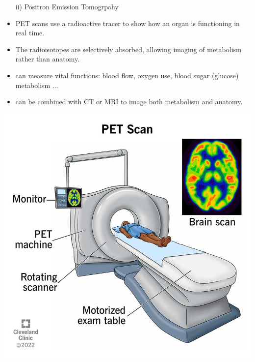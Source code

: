 \documentclass{beamer}
\begin{document}
\begin{frame}
	\begin{itemize}
		\item[ii)] Positron Emission Tomogrpahy
		\item PET scans use a radioactive tracer to show how an organ is functioning in real time.
		\item The radioisotopes are selectively absorbed, allowing imaging of metabolism rather than anatomy.
		 \pause
\item can measure vital functions: blood flow, oxygen use, blood sugar (glucose) metabolism ...
\item can be combined with CT or MRI to image both metabolism and anatomy.
	\end{itemize}
	\center 
\includegraphics[scale=0.15]{media/pet-scan.jpg}
\end{frame}
\end{document}
